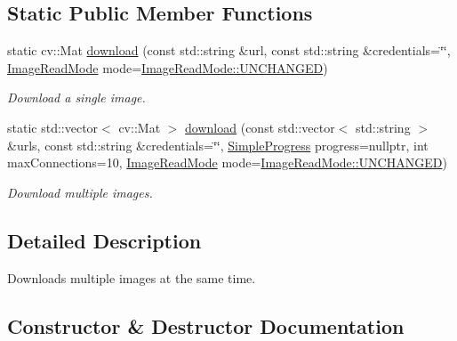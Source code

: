 \subsection*{Static Public Member Functions}
\begin{DoxyCompactItemize}
\item 
static cv\+::\+Mat \hyperlink{group___imagery_module_ga82fca828a982b5f7cb7c15669c5b23df}{download} (const std\+::string \&url, const std\+::string \&credentials=\char`\"{}\char`\"{}, \hyperlink{group___imagery_module_ga1db94ae833853b71ed501bb1ea8c1c24}{Image\+Read\+Mode} mode=\hyperlink{namespacedg_1_1deepcore_1_1imagery_ga1db94ae833853b71ed501bb1ea8c1c24a46335765005ff44b1fe1e38e5d2ddfcc}{Image\+Read\+Mode\+::\+U\+N\+C\+H\+A\+N\+G\+ED})
\begin{DoxyCompactList}\small\item\em Download a single image. \end{DoxyCompactList}\item 
static std\+::vector$<$ cv\+::\+Mat $>$ \hyperlink{group___imagery_module_gaacc87d30277f2e58dd3cc5a52c8d4a5a}{download} (const std\+::vector$<$ std\+::string $>$ \&urls, const std\+::string \&credentials=\char`\"{}\char`\"{}, \hyperlink{group___utility_module_ga6763018df79e4bdbcd8cd14cea5342b2}{Simple\+Progress} progress=nullptr, int max\+Connections=10, \hyperlink{group___imagery_module_ga1db94ae833853b71ed501bb1ea8c1c24}{Image\+Read\+Mode} mode=\hyperlink{namespacedg_1_1deepcore_1_1imagery_ga1db94ae833853b71ed501bb1ea8c1c24a46335765005ff44b1fe1e38e5d2ddfcc}{Image\+Read\+Mode\+::\+U\+N\+C\+H\+A\+N\+G\+ED})
\begin{DoxyCompactList}\small\item\em Download multiple images. \end{DoxyCompactList}\end{DoxyCompactItemize}


\subsection{Detailed Description}
Downloads multiple images at the same time. 

\subsection{Constructor \& Destructor Documentation}
